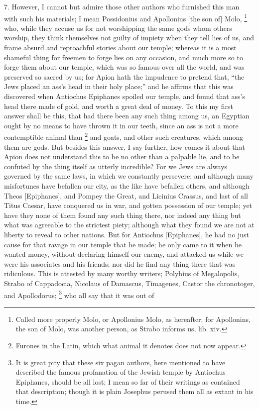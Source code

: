7. However, I cannot but admire those other authors who furnished this man
with such his materials; I mean Possidonius and Apollonius [the son of]
Molo, \footnote{Called more properly Molo,
or Apollonius Molo, as hereafter; for Apollonins, the son of Molo, was
another person, as Strabo informs us, lib. xiv.}
who, while they accuse us for not worshipping the same gods whom others
worship, they think themselves not guilty of impiety when they tell lies
of us, and frame absurd and reproachful stories about our temple; whereas
it is a most shameful thing for freemen to forge lies on any occasion, and
much more so to forge them about our temple, which was so famous over all
the world, and was preserved so sacred by us; for Apion hath the impudence
to pretend that, ``the Jews placed an ass's head in their holy place;'' and
he affirms that this was discovered when Antiochus Epiphanes spoiled our
temple, and found that ass's head there made of gold, and worth a great
deal of money. To this my first answer shall be this, that had there been
any such thing among us, an Egyptian ought by no means to have thrown it
in our teeth, since an ass is not a more contemptible animal than \footnote{Furones in the Latin,
which what animal it denotes does not now appear.}
and goats, and other such creatures, which among them are gods. But
besides this answer, I say further, how comes it about that Apion does not
understand this to be no other than a palpable lie, and to be confuted by
the thing itself as utterly incredible? For we Jews are always governed by
the same laws, in which we constantly persevere; and although many
misfortunes have befallen our city, as the like have befallen others, and
although Theos [Epiphanes], and Pompey the Great, and Licinius Crassus,
and last of all Titus Caesar, have conquered us in war, and gotten
possession of our temple; yet have they none of them found any such thing
there, nor indeed any thing but what was agreeable to the strictest piety;
although what they found we are not at liberty to reveal to other nations.
But for Antiochus [Epiphanes], he had no just cause for that ravage in our
temple that he made; he only came to it when he wanted money, without
declaring himself our enemy, and attacked us while we were his associates
and his friends; nor did he find any thing there that was ridiculous. This
is attested by many worthy writers; Polybius of Megalopolis, Strabo of
Cappadocia, Nicolaus of Damascus, Timagenes, Castor the chronotoger, and
Apollodorus; \footnote{It is great pity that
these six pagan authors, here mentioned to have described the famous
profanation of the Jewish temple by Antiochus Epiphanes, should be all
lost; I mean so far of their writings as contained that description;
though it is plain Josephus perused them all as extant in his time.} who all say that it was out of
